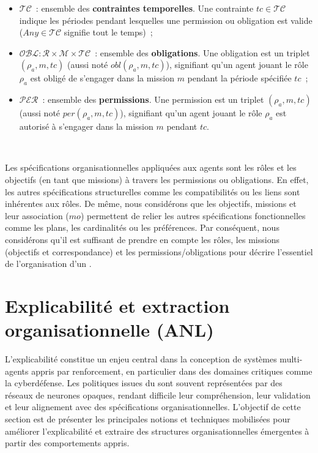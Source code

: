 \begin{itemize}
    \item $\mathcal{TC}$~: ensemble des \textbf{contraintes temporelles}. Une contrainte $tc \in \mathcal{TC}$ indique les périodes pendant lesquelles une permission ou obligation est valide ($Any \in \mathcal{TC}$ signifie tout le temps)~;
    \item $\mathcal{OBL}: \mathcal{R} \times \mathcal{M} \times \mathcal{TC}$~: ensemble des \textbf{obligations}. Une obligation est un triplet $(\rho_a, m, tc)$ (aussi noté $obl(\rho_a, m, tc)$), signifiant qu'un agent jouant le rôle $\rho_a$ est obligé de s'engager dans la mission $m$ pendant la période spécifiée $tc$~;
    \item $\mathcal{PER}$~: ensemble des \textbf{permissions}. Une permission est un triplet $(\rho_a, m, tc)$ (aussi noté $per(\rho_a, m, tc)$), signifiant qu'un agent jouant le rôle $\rho_a$ est autorisé à s'engager dans la mission $m$ pendant $tc$.
\end{itemize}

\

\noindent Les spécifications organisationnelles appliquées aux agents sont les rôles et les objectifs (en tant que missions) à travers les permissions ou obligations. En effet, les autres spécifications structurelles comme les compatibilités ou les liens sont inhérentes aux rôles. De même, nous considérons que les objectifs, missions et leur association ($mo$) permettent de relier les autres spécifications fonctionnelles comme les plans, les cardinalités ou les préférences.
Par conséquent, nous considérons qu'il est suffisant de prendre en compte les rôles, les missions (objectifs et correspondance) et les permissions/obligations pour décrire l'essentiel de l'organisation d'un .


\section{Explicabilité et extraction organisationnelle (ANL)}

\noindent
L’explicabilité constitue un enjeu central dans la conception de systèmes multi-agents
appris par renforcement, en particulier dans des domaines critiques comme la cyberdéfense.
Les politiques issues du  sont souvent représentées par des réseaux de neurones
opaques, rendant difficile leur compréhension, leur validation et leur alignement
avec des spécifications organisationnelles.
L’objectif de cette section est de présenter les principales notions et techniques
mobilisées pour améliorer l’explicabilité et extraire des structures organisationnelles
émergentes à partir des comportements appris.


